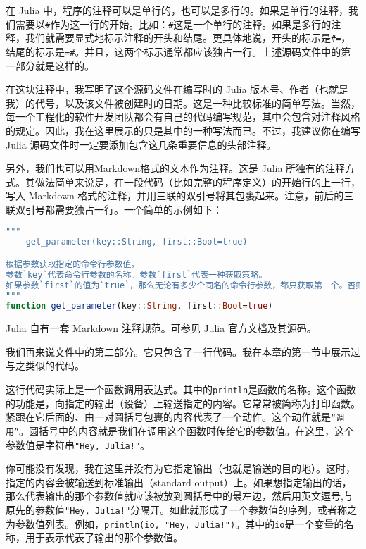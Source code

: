在 Julia 中，程序的注释可以是单行的，也可以是多行的。如果是单行的注释，我们需要以\verb`#`作为这一行的开始。比如：\verb`#`这是一个单行的注释。如果是多行的注释，我们就需要显式地标示注释的开头和结尾。更具体地说，开头的标示是\verb`#=`，结尾的标示是\verb`=#`。并且，这两个标示通常都应该独占一行。上述源码文件中的第一部分就是这样的。

在这块注释中，我写明了这个源码文件在编写时的 Julia 版本号、作者（也就是我）的代号，以及该文件被创建时的日期。这是一种比较标准的简单写法。当然，每一个工程化的软件开发团队都会有自己的代码编写规范，其中会包含对注释风格的规定。因此，我在这里展示的只是其中的一种写法而已。不过，我建议你在编写 Julia 源码文件时一定要添加包含这几条重要信息的头部注释。

另外，我们也可以用Markdown格式的文本作为注释。这是 Julia 所独有的注释方式。其做法简单来说是，在一段代码（比如完整的程序定义）的开始行的上一行，写入 Markdown 格式的注释，并用三联的双引号将其包裹起来。注意，前后的三联双引号都需要独占一行。一个简单的示例如下：

\begin{lstlisting}[language=julia]
"""
    get_parameter(key::String, first::Bool=true)

根据参数获取指定的命令行参数值。
参数`key`代表命令行参数的名称。参数`first`代表一种获取策略。
如果参数`first`的值为`true`，那么无论有多少个同名的命令行参数，都只获取第一个。否则只获取最后一个。
"""
function get_parameter(key::String, first::Bool=true)
\end{lstlisting}

Julia 自有一套 Markdown 注释规范。可参见 Julia 官方文档及其源码。

我们再来说文件中的第二部分。它只包含了一行代码。我在本章的第一节中展示过与之类似的代码。

这行代码实际上是一个函数调用表达式。其中的\verb`println`是函数的名称。这个函数的功能是，向指定的输出（设备）上输送指定的内容。它常常被简称为打印函数。紧跟在它后面的、由一对圆括号包裹的内容代表了一个动作。这个动作就是\verb`“调用”`。圆括号中的内容就是我们在调用这个函数时传给它的参数值。在这里，这个参数值是字符串\verb`"Hey, Julia!"`。

你可能没有发现，我在这里并没有为它指定输出（也就是输送的目的地）。这时，指定的内容会被输送到标准输出（standard output）上。如果想指定输出的话，那么代表输出的那个参数值就应该被放到圆括号中的最左边，然后用英文逗号,与原先的参数值\verb`"Hey, Julia!"`分隔开。如此就形成了一个参数值的序列，或者称之为参数值列表。例如，\verb`println(io, "Hey, Julia!")`。其中的\verb`io`是一个变量的名称，用于表示代表了输出的那个参数值。

